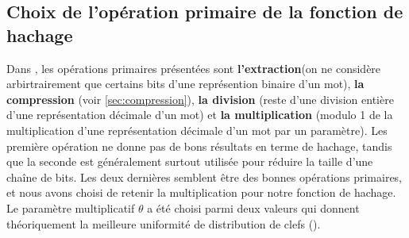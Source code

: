 \documentclass[final,twoside,article,10pt]{scrartcl}
\begin{document}
    \subsection{Choix de l'opération primaire de la fonction de hachage}
    Dans \cite{soria}, les opérations primaires présentées sont \textbf{l'extraction}(on ne considère arbirtrairement que certains bits d'une représention binaire d'un mot), \textbf{la compression} (voir \ref{sec:compression}), \textbf{la division} (reste d'une division entière d'une représentation décimale d'un mot) et \textbf{la multiplication} (modulo 1 de la multiplication d'une représentation décimale d'un mot par un paramètre).
    Les première opération ne donne pas de bons résultats en terme de hachage, tandis que la seconde est généralement surtout utilisée pour réduire la taille d'une chaîne de bits. Les deux dernières semblent être des bonnes opérations primaires, et nous avons choisi de retenir la multiplication pour notre fonction de hachage. Le paramètre multiplicatif $\theta$ a été choisi parmi deux valeurs qui donnent théoriquement la meilleure uniformité de distribution de clefs (\cite{soria}).
\end{document}
